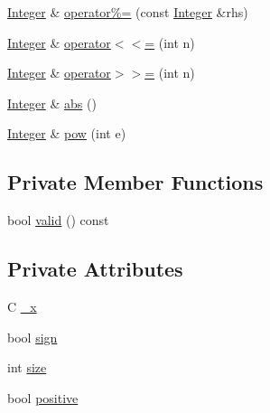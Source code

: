 \begin{DoxyCompactItemize}
\item 
\hyperlink{class_integer}{Integer} \& \hyperlink{class_integer_a5af44fd8bef5e32fa720b1262045f1b7}{operator\%=} (const \hyperlink{class_integer}{Integer} \&rhs)
\item 
\hyperlink{class_integer}{Integer} \& \hyperlink{class_integer_a4114e69e0da713f50f9cf946cfc70637}{operator$<$$<$=} (int n)
\item 
\hyperlink{class_integer}{Integer} \& \hyperlink{class_integer_a0fbada94834715ce6b91c39e5d41d24f}{operator$>$$>$=} (int n)
\item 
\hyperlink{class_integer}{Integer} \& \hyperlink{class_integer_a28b38b99580e4787e353c6630c3cf063}{abs} ()
\item 
\hyperlink{class_integer}{Integer} \& \hyperlink{class_integer_aae56deca12053a28469749c93c9f7343}{pow} (int e)
\end{DoxyCompactItemize}
\subsection*{Private Member Functions}
\begin{DoxyCompactItemize}
\item 
bool \hyperlink{class_integer_ace6a3dac75762d6c42b42285a426828c}{valid} () const 
\end{DoxyCompactItemize}
\subsection*{Private Attributes}
\begin{DoxyCompactItemize}
\item 
C \hyperlink{class_integer_a19f83aa8d5d86634885eb63d15bcdb6d}{\-\_\-x}
\item 
bool \hyperlink{class_integer_a15f88a897d21af49d5cc5910ce65be84}{sign}
\item 
int \hyperlink{class_integer_a9fc5e657b8c50cbf7c13f095b060dee9}{size}
\item 
bool \hyperlink{class_integer_af0750e482d739e0d2ebb7185c6b22fc2}{positive}
\end{DoxyCompactItemize}
